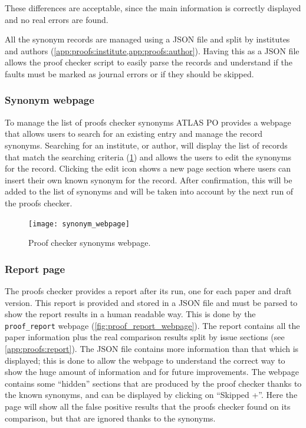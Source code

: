 These differences are acceptable, since the main information is correctly displayed and no real errors are found.

All the synonym records are managed using a JSON file and split by institutes and authors (\cref{app:proofs:institute,app:proofs:author}).
Having this as a JSON file allows the proof checker script to easily parse the records and understand if the faults must be marked as journal errors or if they should be skipped.

\subsubsection{Synonym webpage}
\label{sec:Synonym_webpage}

To manage the list of proofs checker synonyms ATLAS PO provides a webpage that allows users to search for an existing entry and manage the record synonyms.
Searching for an institute, or author, will display the list of records that match the searching criteria (\cref{fig:synonym_webpage}) and allows the users to edit the synonyms for the record.
Clicking the edit icon shows a new page section where users can insert their own known synonym for the record.
After confirmation, this will be added to the list of synonyms and will be taken into account by the next run of the proofs checker.

\begin{figure}[htb]
  \centering
  \texttt{[image: synonym\_webpage]}
  \caption{Proof checker synonyms webpage.}
  \label{fig:synonym_webpage}
\end{figure}

\subsubsection{Report page}
\label{sec:Report_page}

The proofs checker provides a report after its run, one for each paper and draft version.
This report is provided and stored in a JSON file and must be parsed to show the report results in a human readable way.
This is done by the \texttt{proof\_report} webpage (\cref{fig:proof_report_webpage}).
The report contains all the paper information plus the real comparison results split by issue sections (see \cref{app:proofs:report}).
The JSON file contains more information than that which is displayed;
this is done to allow the webpage to understand the correct way to show the huge amount of information and for future improvements.
The webpage contains some \enquote{hidden} sections that are produced by the proof checker thanks to the known synonyms,
and can be displayed by clicking on \enquote{Skipped +}.
Here the page will show all the false positive results that the proofs checker found on its comparison, but that are ignored thanks to the synonyms.

